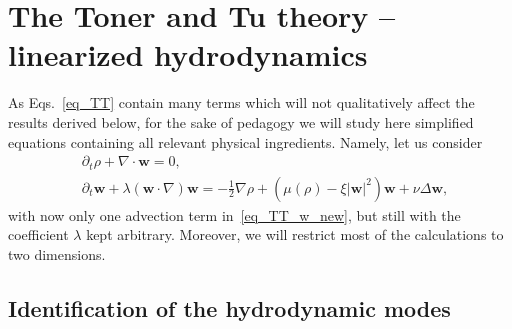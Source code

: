 \section{The Toner and Tu theory -- linearized hydrodynamics}

As Eqs.~\eqref{eq_TT} contain many terms which will not qualitatively affect the results derived below, 
for the sake of pedagogy we will study here simplified equations containing all relevant physical ingredients.
Namely, let us consider
\begin{subequations}
\label{eq_TT_new}
\begin{align}
\label{eq_TT_rho_new}
& \partial_t \rho + \nabla \cdot \bm w = 0 , \\
\label{eq_TT_w_new}
& \partial_t \bm w + \lambda (\bm w \cdot \nabla)\bm w = 
-\frac{1}{2}\nabla \rho + \left( \mu(\rho) - \xi |\bm w|^2 \right) \bm w + \nu \Delta \bm w ,
\end{align}
\end{subequations}
with now only one advection term in~\eqref{eq_TT_w_new}, but still with the coefficient $\lambda$ kept arbitrary.
Moreover, we will restrict most of the calculations to two dimensions.

\subsection{Identification of the hydrodynamic modes}

